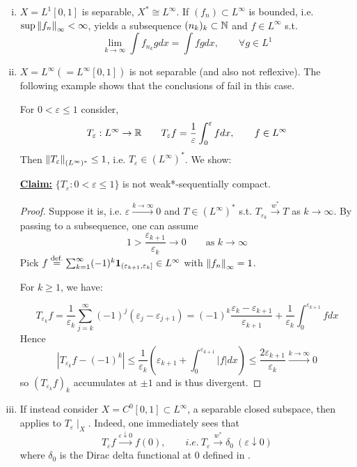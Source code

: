 \documentclass{article}
\begin{document}
\begin{example}
    \begin{enumerate}[i)]
        \item $X = L^1[0,1]$ is separable, $X^* \cong L^{\infty}$.
        If $(f_n) \subset L^{\infty}$ is bounded, i.e. $\sup \left\|{f_n}\right\|_\infty < \infty$,  yields a subsequence $(n_k)_k \subset \mathbb{N}$ and $f\in L^{\infty}$ s.t.  
        $$
        \lim_{k \to \infty} \int f_{n_k}g dx = \int fg dx, \qquad \forall g\in L^1
        $$
        \item $X = L^{\infty}(=L^{\infty}[0,1])$ is not separable (and also not reflexive). The following example shows that the conclusions of  fail in this case. 
        
        For $0<\varepsilon\leq 1$ consider,  
        $$
        T_{\varepsilon}:L^{\infty} \to \mathbb{R} \qquad T_\varepsilon f = \frac{1}{\varepsilon} \int_0^{\varepsilon} f dx, \qquad f\in L^{\infty}
        $$  
        Then $\left\|{T_\varepsilon}\right\|_{(L^{\infty})^*}\leq 1$, i.e. $T_\varepsilon \in (L^\infty)^*$. We show:  

        \textbf{\underline{Claim:}} $\{T_\varepsilon: 0< \varepsilon \leq 1\}$ is not weak*-sequentially compact.  
        \begin{proof}
            Suppose it is, i.e. $\varepsilon \overset{k  \to \infty}{\longrightarrow} 0$ and $T \in (L^{\infty})^*$ s.t. $T_{\varepsilon_k} \overset{w^*}{\longrightarrow} T$ as $k\to \infty$. By passing to a subsequence, one can assume  
            $$
            1 > \frac{\varepsilon_{k+1}}{\varepsilon_{k}} \to 0 \qquad \text{as\ } k\to \infty
            $$
            Pick $f\stackrel{\text{def.}}{=} \sum_{k=1}^{\infty}(-1)^k \mathbf{1}_{(\varepsilon_{k+1}, \varepsilon_k]} \in L^{\infty}$ with $\left\|{f_n}\right\|_\infty=1$.  

            For $k\geq 1$, we have:  

            $$
            T_{\varepsilon_k}f = \frac{1}{\varepsilon_k} \sum_{j=k}^{\infty} (-1)^j (\varepsilon_j - \varepsilon_{j+1}) = (-1)^k \frac{\varepsilon_k - \varepsilon_{k+1}}{\varepsilon_{k+1}} +\frac{1}{\varepsilon_k} \int_0^{\varepsilon_{k+1}} f dx
            $$  
            Hence  
            $$
            |T_{\varepsilon_k}f-(-1)^{k}| \leq \frac{1}{\varepsilon_k} \left(\varepsilon_{k+1} + \int_0^{\varepsilon_{k+1}} |f| dx\right) \leq \frac{2\varepsilon_{k+1}}{\varepsilon_k} \overset{k\to \infty}{\longrightarrow} 0
            $$  
            so $(T_{\varepsilon_k} f)_k$ accumulates at $\pm 1$ and is thus divergent.
        \end{proof}

    \item If instead consider $X = C^0[0,1]\subset L^{\infty}$, a separable closed subspace, then  applies to $T_\varepsilon \mid_X$. Indeed, one immediately sees that  
    $$
    T_\varepsilon f \overset{\varepsilon \downarrow 0}{\longrightarrow} f(0), \qquad i.e. \ T_\varepsilon \overset{w^*}{\rightarrow} \delta_0 \ (\varepsilon \downarrow 0)
    $$
    where $\delta_0$ is the Dirac delta functional at $0$ defined in .
    \end{enumerate}
\end{example}
\end{document}
